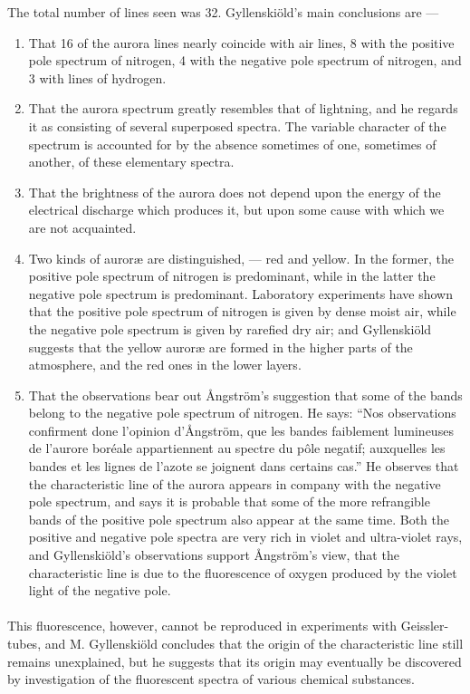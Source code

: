 \documentclass[a4paper, 12pt, oneside, polutonikogreek, english]{article}
\begin{document}
The total number of lines seen was 32. Gyllenskiöld's main conclusions are ---
\begin{enumerate}
    \item That 16 of the aurora lines nearly coincide with air lines, 8 with the positive pole spectrum of nitrogen, 4 with the negative pole spectrum of nitrogen, and 3 with lines of hydrogen.

    \item That the aurora spectrum greatly resembles that of lightning, and he regards it as consisting of several superposed spectra. The variable character of the spectrum is accounted for by the absence sometimes of one, sometimes of another, of these elementary spectra.

    \item That the brightness of the aurora does not depend upon the energy of the electrical discharge which produces it, but upon some cause with which we are not acquainted.

    \item Two kinds of auroræ are distinguished, --- red and yellow. In the former, the positive pole spectrum of nitrogen is predominant, while in the latter the negative pole spectrum is predominant. Laboratory experiments have shown that the positive pole spectrum of nitrogen is given by dense moist air, while the negative pole spectrum is given by rarefied dry air; and Gyllenskiöld suggests that the yellow auroræ are formed in the higher parts of the atmosphere, and the red ones in the lower layers.

    \item That the observations bear out Ångström's suggestion that some of the bands belong to the negative pole spectrum of nitrogen. He says: ``Nos observations confirment done l'opinion d'Ångström, que les bandes faiblement lumineuses de l'aurore boréale appartiennent au spectre du pôle negatif; auxquelles les bandes et les lignes de l'azote se joignent dans certains cas.'' He observes that the characteristic line of the aurora appears in company with the negative pole spectrum, and says it is probable that some of the more refrangible bands of the positive pole spectrum also appear at the same time. Both the positive and negative pole spectra are very rich in violet and ultra-violet rays, and Gyllenskiöld's observations support Ångström's view, that the characteristic line is due to the fluorescence of oxygen produced by the violet light of the negative pole.
\end{enumerate}
\paragraph{}
This fluorescence, however, cannot be reproduced in experiments with Geissler-tubes, and M. Gyllenskiöld concludes that the origin of the characteristic line still remains unexplained, but he suggests that its origin may eventually be discovered by investigation of the fluorescent spectra of various chemical substances.
\end{document}

